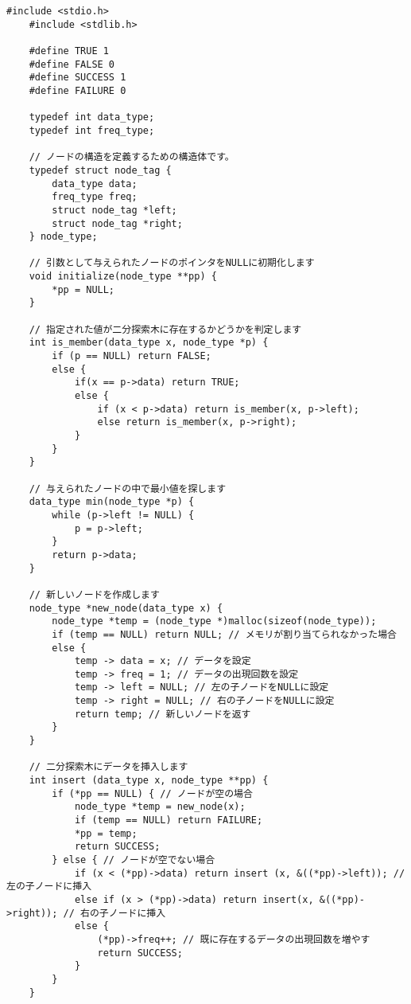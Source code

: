 \documentclass[]{jsarticle}
\begin{document}
\begin{lstlisting}[caption={binarySearchTree.c}]
    #include <stdio.h>
    #include <stdlib.h>
    
    #define TRUE 1
    #define FALSE 0
    #define SUCCESS 1
    #define FAILURE 0
    
    typedef int data_type;
    typedef int freq_type;
    
    // ノードの構造を定義するための構造体です。
    typedef struct node_tag {
        data_type data;
        freq_type freq;
        struct node_tag *left;
        struct node_tag *right;
    } node_type;
    
    // 引数として与えられたノードのポインタをNULLに初期化します
    void initialize(node_type **pp) {
        *pp = NULL;
    }
    
    // 指定された値が二分探索木に存在するかどうかを判定します
    int is_member(data_type x, node_type *p) {
        if (p == NULL) return FALSE;
        else {
            if(x == p->data) return TRUE;
            else {
                if (x < p->data) return is_member(x, p->left);
                else return is_member(x, p->right);
            }
        }
    }
    
    // 与えられたノードの中で最小値を探します
    data_type min(node_type *p) {
        while (p->left != NULL) {
            p = p->left;
        }
        return p->data;
    }
    
    // 新しいノードを作成します
    node_type *new_node(data_type x) {
        node_type *temp = (node_type *)malloc(sizeof(node_type));
        if (temp == NULL) return NULL; // メモリが割り当てられなかった場合
        else {
            temp -> data = x; // データを設定
            temp -> freq = 1; // データの出現回数を設定
            temp -> left = NULL; // 左の子ノードをNULLに設定
            temp -> right = NULL; // 右の子ノードをNULLに設定
            return temp; // 新しいノードを返す
        }
    }
    
    // 二分探索木にデータを挿入します
    int insert (data_type x, node_type **pp) {
        if (*pp == NULL) { // ノードが空の場合
            node_type *temp = new_node(x);
            if (temp == NULL) return FAILURE;
            *pp = temp;
            return SUCCESS;
        } else { // ノードが空でない場合
            if (x < (*pp)->data) return insert (x, &((*pp)->left)); // 左の子ノードに挿入
            else if (x > (*pp)->data) return insert(x, &((*pp)->right)); // 右の子ノードに挿入
            else {
                (*pp)->freq++; // 既に存在するデータの出現回数を増やす
                return SUCCESS;
            }
        }
    }
    

\end{lstlisting}
\end{document}
